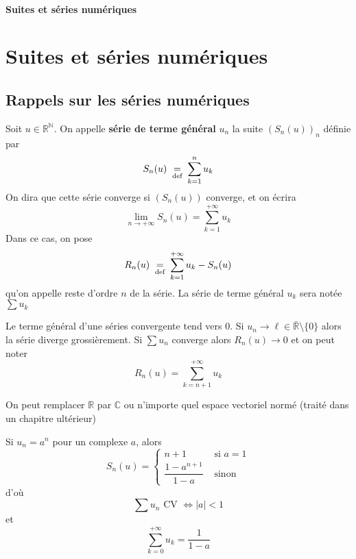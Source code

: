 \ifsolo
    ~

    \vspace{1cm}

    \begin{center}
        \textbf{\LARGE Suites et séries numériques} \\[1em]
    \end{center}
    \tableofcontents
\else
    \chapter{Suites et séries numériques}

    \minitoc
\fi
\thispagestyle{empty}

\ifsolo \newpage \setcounter{page}{1} \fi

\section{Rappels sur les séries numériques}

\begin{dfn}
    Soit $u\in\mathbb R^{\mathbb N}$. On appelle \textbf{série de terme général} $u_n$ la suite $(S_n(u))_n$ définie par \[
        S_n(u)\;\underset{\text{def}}=\; \sum_{k=1}^nu_k
    \]
    On dira que cette série converge si $(S_n(u))$ converge, et on écrira \[
        \lim_{n\to+\infty}S_n(u)=\sum_{k=1}^{+\infty}u_k
    \]
    Dans ce cas, on pose \[
        R_n(u)\;\underset{\text{def}}=\;\sum_{k=1}^{+\infty}u_k-S_n(u)
    \]
    qu'on appelle reste d'ordre $n$ de la série. La série de terme général $u_k$ sera notée $\sum u_k$
\end{dfn}


\begin{rem}
    Le terme général d'une séries convergente tend vers $0$. Si $u_n\longrightarrow \ell\in\bar{ \mathbb R}\setminus\{0\}$ alors la série diverge grossièrement. Si $\sum u_n$ converge alors $R_n(u)\longrightarrow0$ et on peut noter \[
        R_n(u)=\sum_{k=n+1}^{+\infty}u_k
    \]
\end{rem}

\begin{rem}
    On peut remplacer $\mathbb R$ par $\mathbb C$ ou n'importe quel espace vectoriel normé (traité dans un chapitre ultérieur)
\end{rem}

\begin{ex}
    Si $u_n=a^n$ pour un complexe $a$, alors \[
        S_n(u)= \begin{cases}
            n+1 &\text{ si }a=1\\[1em]
            \dfrac{1-a^{n+1}}{1-a}&\text{ sinon}
        \end{cases}
    \]
    d'où \[
        \sum u_n\text{ CV }\iff |a|<1
    \]
    et \[
        \sum_{k=0}^{+\infty}u_k=\frac1{1-a}
    \]
\end{ex}

